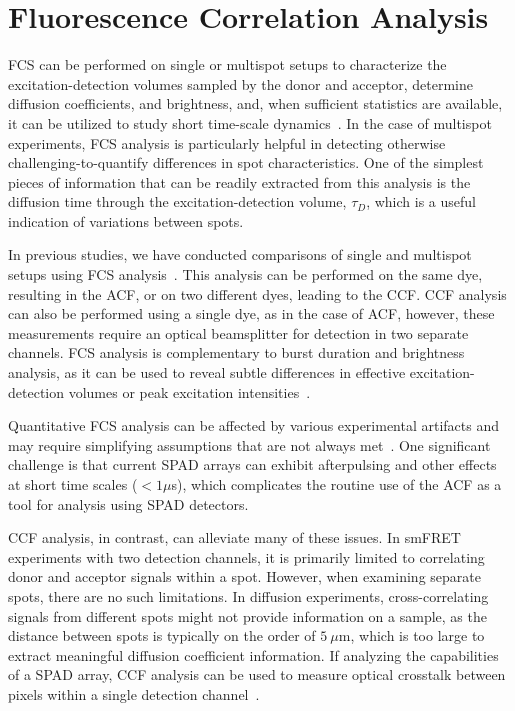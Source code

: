 \section{Fluorescence Correlation Analysis}
\label{sec:fcs_analysis_apdx}

\ac{FCS} can be performed on single or multispot setups to characterize the excitation-detection volumes sampled by the donor and acceptor, determine diffusion coefficients, and brightness, and, when sufficient statistics are available, it can be utilized to study short time-scale dynamics~\cite{krichevsky_RPP_2002}. 
In the case of multispot experiments, \ac{FCS} analysis is particularly helpful in detecting otherwise challenging-to-quantify differences in spot characteristics. 
One of the simplest pieces of information that can be readily extracted from this analysis is the diffusion time through the excitation-detection volume, $\tau_D$, which is a useful indication of variations between spots.

In previous studies, we have conducted comparisons of single and multispot setups using FCS analysis~\cite{colyer_BOE_2010,ingargiola_PLOS1_2016, ingargiola_JCP_2018}. 
This analysis can be performed on the same dye, resulting in the \ac{ACF}, or on two different dyes, leading to the \ac{CCF}.
\ac{CCF} analysis can also be performed using a single dye, as in the case of \ac{ACF}, however, these measurements require an optical beamsplitter for detection in two separate channels.
\ac{FCS} analysis is complementary to burst duration and brightness analysis, as it can be used to reveal subtle differences in effective excitation-detection volumes or peak excitation intensities~\cite{ingargiola_PLOS1_2016}.

Quantitative \ac{FCS} analysis can be affected by various experimental artifacts and may require simplifying assumptions that are not always met~\cite{hess_BJ_2002, enderlein_CPB_2004}. 
One significant challenge is that current \ac{SPAD} arrays can exhibit afterpulsing and other effects at short time scales ($< 1 \mu$s), which complicates the routine use of the \ac{ACF} as a tool for analysis using \ac{SPAD} detectors.

\ac{CCF} analysis, in contrast, can alleviate many of these issues. 
In \ac{smFRET} experiments with two detection channels, it is primarily limited to correlating donor and acceptor signals within a spot. 
However, when examining separate spots, there are no such limitations. 
In diffusion experiments, cross-correlating signals from different spots might not provide information on a sample, as the distance between spots is typically on the order of $5~\mu$m, which is too large to extract meaningful diffusion coefficient information. 
If analyzing the capabilities of a \ac{SPAD} array, \ac{CCF} analysis can be used to measure optical crosstalk between pixels within a single detection channel~\cite{ingargiola_PLOS1_2016, ingargiola_NIMA_2018}.

